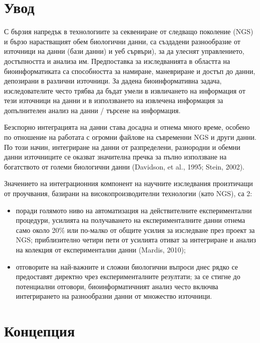 \documentclass[12pt, a4paper, oneside]{book}
\begin{document}
\chapter*{Увод}

С бързия напредък в технологиите за секвениране от следващо поколение (NGS) и бързо нарастващият обем биологични данни, са създадени разнообразие от източници на данни (бази данни) и уеб сървъри), за да улеснят управлението, достъпността и анализа им. Предпоставка за изследванията в областта на биоинформатиката са способността за намиране, маневриране и достъп до данни, депозирани в различни източници. За дадена биоинформативна задача, изследователите често трябва да бъдат умели в извличането на информация от тези източници на данни и в използването на извлечена информация за допълнителен анализ на данни / търсене на информация. \cite{BIOINFORMATICS-TRENDS-AND-METHODOLOGIES}

Безспорно интеграцията на данни става досадна и отнема много време, особено по отношение на работата с огромни файлове на съвременни NGS и други данни. По този начин, интегриране на данни от разпределени, разнородни и обемни данни източниците се оказват значителна пречка за пълно използване на богатството от големи биологични данни (Davidson, et al., 1995; Stein, 2002).\cite{BIOINFORMATICS-TRENDS-AND-METHODOLOGIES}

Значението на интеграционния компонент на научните изследвания произтичащи от проучвания, базирани на високопроизводителни технологии (като NGS), са 2:
\begin{itemize}
    \item поради голямото ниво на автоматизация на действителните експериментални процедури, усилията на
получаването на експерименталните данни отнема само около 20\% или по-малко от общите усилия за изследване през проект за NGS; приблизително четири пети от усилията отиват за интегриране и анализ на колекция от експериментални данни (Mardis, 2010);
    \item отговорите на най-важните и сложни биологични въпроси днес рядко се предоставят директно чрез експерименталните резултати; за се стигне до потенциални отговори, биоинформатичният анализ често включва интегрирането на разнообразни данни от множество източници.
\end{itemize}
\cite{BIOINFORMATICS-TRENDS-AND-METHODOLOGIES}

\chapter*{Концепция}
\end{document}
